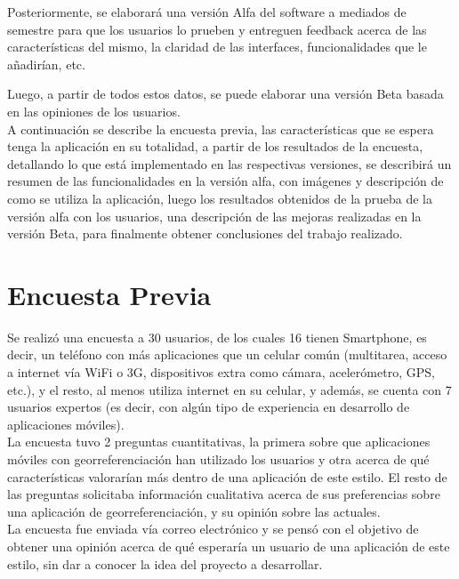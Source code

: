 \documentclass[10pt,letterpaper]{article}
\begin{document}
Posteriormente, se elaborará una versión Alfa del software a mediados de semestre para que los usuarios lo prueben y entreguen feedback acerca de las características del mismo, la claridad de las interfaces, funcionalidades que le añadirían, etc.

Luego, a partir de todos estos datos, se puede elaborar una versión Beta basada en las opiniones de los usuarios.\\

A continuación se describe la encuesta previa, las características que se espera tenga la aplicación en su totalidad, a partir de los resultados de la encuesta, detallando lo que está implementado en las respectivas versiones, se describirá un resumen de las funcionalidades en la versión alfa, con imágenes y descripción de como se utiliza la aplicación, luego los resultados obtenidos de la prueba de la versión alfa con los usuarios, una descripción de las mejoras realizadas en la versión Beta, para finalmente obtener conclusiones del trabajo realizado.\\

\newpage
\section{Encuesta Previa}

Se realizó una encuesta a 30 usuarios, de los cuales 16 tienen Smartphone, es decir, un teléfono con más aplicaciones que un celular común (multitarea, acceso a internet vía WiFi o 3G, dispositivos extra como cámara, acelerómetro, GPS, etc.), y el resto, al menos utiliza internet en su celular, y además, se cuenta con 7 usuarios expertos (es decir, con algún tipo de experiencia en desarrollo de aplicaciones móviles).\\

La encuesta tuvo 2 preguntas cuantitativas, la primera sobre que aplicaciones móviles con georreferenciación han utilizado los usuarios y otra acerca de qué características valorarían más dentro de una aplicación de este estilo. El resto de las preguntas solicitaba información cualitativa acerca de sus preferencias sobre una aplicación de georreferenciación, y su opinión sobre las actuales.\\

La encuesta fue enviada vía correo electrónico y se pensó con el objetivo de obtener una opinión acerca de qué esperaría un usuario de una aplicación de este estilo, sin dar a conocer la idea del proyecto a desarrollar.\\
\end{document}
